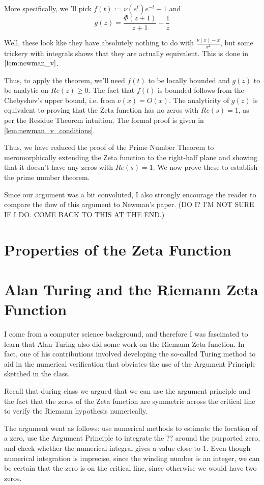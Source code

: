 \documentclass{article}
\theoremstyle{definition}
\begin{document}
More specifically, we 'll pick $ f(t) := \nu(e^{t}) e^{-t} -1 $ and 
\[ g(z) = \frac{\Phi(z+1)}{z+1} - \frac{1}{z} \]

Well, these look like they have absolutely nothing to do with $ \frac{\nu(x) - x}{x^{2}} $,
but some trickery with integrals shows that they are actually equivalent. This
is done in $ \ref{lem:newman_v} $.

Thus, to apply the theorem, we'll need $ f(t) $ to be locally bounded 
and $ g(z) $ to be analytic on $ Re(z) \geq 0 $.
The fact that $ f(t) $ is bounded follows from the Chebyshev's upper bound,
i.e. from $ \nu(x) = O(x) $. The analyticity of $ g(z) $ is equivalent to proving
that the Zeta function has no zeros with $ Re(s) = 1 $, as per the Residue Theorem
intuition. The formal proof is given in \ref{lem:newman_v_conditions}.



Thus, we have reduced the proof of the Prime Number Theorem to meromorphically
extending the Zeta function to the right-half plane and showing that it doesn't
have any zeros with $ Re(s) = 1 $. We now prove these to establish the prime number theorem.

Since our argument was a bit convoluted, I also strongly encourage the reader to compare
the flow of this argument to Newman's paper. (DO I? I'M NOT SURE IF I DO. COME BACK
TO THIS AT THE END.)

\section{Properties of the Zeta Function}


\section{Alan Turing and the Riemann Zeta Function}

I come from a computer science background, and therefore I was fascinated to learn
that Alan Turing also did some work on the Riemann Zeta function. In fact, one of
his contributions involved developing the so-called Turing method to aid in the
numerical verification that obviates the use of the Argument Principle sketched in
the class.

Recall that during class we argued that we can use the argument principle and the fact
that the zeros of the Zeta function are symmetric across the critical line to verify
the Riemann hypothesis numerically.

The argument went as follows: use numerical methods to estimate the location
of a zero, use the Argument Principle to integrate
the ?? around the purported zero, and check whether the numerical integral
gives a value close to $ 1 $. Even though numerical integration is imprecise,
since the winding number is an integer, we can be certain that the zero is on
the critical line, since otherwise we would have two zeros.
\end{document}
